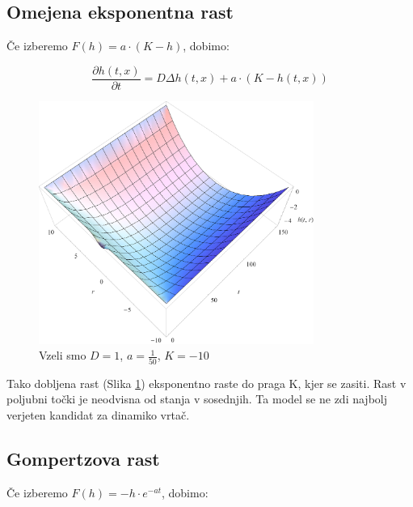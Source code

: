 \documentclass[a4paper, twoside, 12pt]{book}
\begin{document}
          \subsection{Omejena eksponentna rast}

          Če izberemo $F(h) = a \cdot (K - h)$, dobimo:

            \begin{equation}
              \frac{ \partial h(t,x) }{ \partial t} = D \Delta h(t,x) + a \cdot (K - h(t,x))
              \label{difuzija-omejena-eksponentna-rast}
            \end{equation}
            \begin{figure}[h]
              \begin{center}
                \includegraphics[width=9cm]{slike/difuzija-omejena-eksponentna-rast2}
              \end{center}
              \caption{Vzeli smo $D=1$, $a=\frac{1}{50}$, $K=-10$}
              \label{fig:difuzija-omejena-eksponentna-rast}
            \end{figure}

          Tako dobljena rast (Slika \ref{fig:difuzija-omejena-eksponentna-rast}) eksponentno raste do praga K, kjer se zasiti. Rast v poljubni točki je neodvisna od stanja v sosednjih. Ta model se ne zdi najbolj verjeten kandidat za dinamiko vrtač.

          \subsection{Gompertzova rast}

          Če izberemo $F(h) = - h \cdot e^{-a t}$, dobimo:
\end{document}
